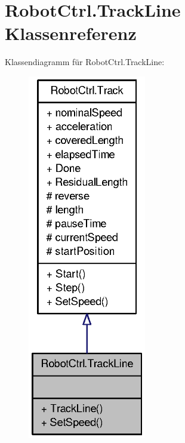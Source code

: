 \hypertarget{class_robot_ctrl_1_1_track_line}{
\section{RobotCtrl.TrackLine Klassenreferenz}
\label{class_robot_ctrl_1_1_track_line}
}


Klassendiagramm für RobotCtrl.TrackLine:\nopagebreak
\begin{figure}[H]
\begin{center}
\leavevmode
\includegraphics[width=146pt]{class_robot_ctrl_1_1_track_line__inherit__graph}
\end{center}
\end{figure}


